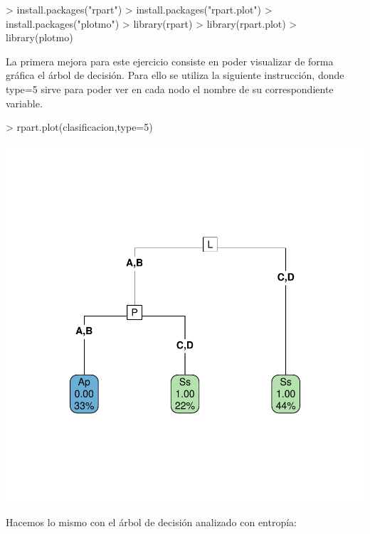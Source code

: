 \documentclass [a4paper] {article}
\begin{document}
\begin{Schunk}
\begin{Sinput}
> install.packages("rpart")
> install.packages("rpart.plot")
> install.packages("plotmo")
> library(rpart)
> library(rpart.plot)
> library(plotmo)
\end{Sinput}
\end{Schunk}

La primera mejora para este ejercicio consiste en poder visualizar de forma gráfica el árbol de decisión.
Para ello se utiliza la siguiente instrucción, donde type=5 sirve para poder ver en cada nodo el nombre
de su correspondiente variable.

\begin{Schunk}
\begin{Sinput}
> rpart.plot(clasificacion,type=5)
\end{Sinput}
\end{Schunk}
\includegraphics{Memoria-Figura 1}

\newpage
Hacemos lo mismo con el árbol de decisión analizado con entropía:
\end{document}
